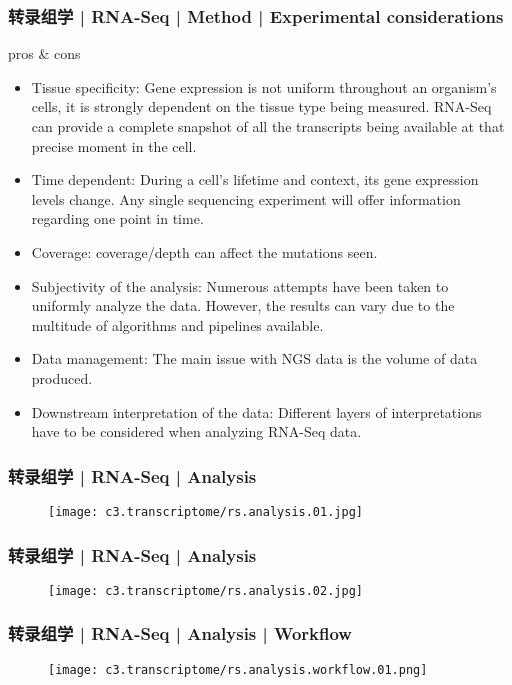 \begin{frame}
  \frametitle{转录组学 | RNA-Seq | Method | Experimental considerations}
  {\footnotesize
  \begin{block}{pros \& cons}
    \begin{itemize}
      \item Tissue specificity: Gene expression is not uniform throughout an organism's cells, it is strongly dependent on the tissue type being measured. RNA-Seq can provide a complete snapshot of all the transcripts being available at that precise moment in the cell.
      \item Time dependent: During a cell's lifetime and context, its gene expression levels change. Any single sequencing experiment will offer information regarding one point in time.
      \item Coverage: coverage/depth can affect the mutations seen.
      \item Subjectivity of the analysis: Numerous attempts have been taken to uniformly analyze the data. However, the results can vary due to the multitude of algorithms and pipelines available.
      \item Data management: The main issue with NGS data is the volume of data produced.
      \item Downstream interpretation of the data: Different layers of interpretations have to be considered when analyzing RNA-Seq data.
    \end{itemize}
  \end{block}
  }
\end{frame}

\begin{frame}
  \frametitle{转录组学 | RNA-Seq | Analysis}
  \begin{figure}
    \centering
    \texttt{[image: c3.transcriptome/rs.analysis.01.jpg]}
  \end{figure}
\end{frame}

\begin{frame}
  \frametitle{转录组学 | RNA-Seq | Analysis}
  \begin{figure}
    \centering
    \texttt{[image: c3.transcriptome/rs.analysis.02.jpg]}
  \end{figure}
\end{frame}

\begin{frame}
  \frametitle{转录组学 | RNA-Seq | Analysis | Workflow}
  \begin{figure}
    \centering
    \texttt{[image: c3.transcriptome/rs.analysis.workflow.01.png]}
  \end{figure}
\end{frame}

